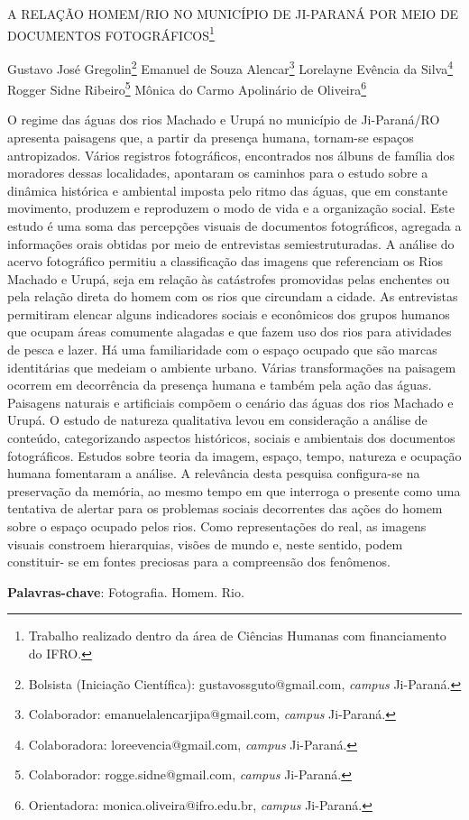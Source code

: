 \documentclass[article,12pt,onesidea,4paper,english,brazil]{abntex2}
\begin{document}
	
	
	\frenchspacing 
	
	\begin{center}
		\LARGE A RELAÇÃO HOMEM/RIO NO MUNICÍPIO DE JI-PARANÁ POR MEIO DE\\
		DOCUMENTOS FOTOGRÁFICOS\footnote{Trabalho realizado dentro da área de Ciências Humanas com financiamento do IFRO.}
		
		\normalsize
		Gustavo José Gregolin\footnote{Bolsista (Iniciação Científica): gustavossguto@gmail.com, \textit{campus} Ji-Paraná.} 
		Emanuel de Souza Alencar\footnote{Colaborador: emanuelalencarjipa@gmail.com, \textit{campus} Ji-Paraná.} 
		Lorelayne Evência da Silva\footnote{Colaboradora: loreevencia@gmail.com, \textit{campus} Ji-Paraná.} \\
		Rogger Sidne Ribeiro\footnote{Colaborador: rogge.sidne@gmail.com, \textit{campus} Ji-Paraná.}
		Mônica do Carmo Apolinário de Oliveira\footnote{Orientadora: monica.oliveira@ifro.edu.br, \textit{campus} Ji-Paraná.} 
	\end{center}
	
	\noindent O regime das águas dos rios Machado e Urupá no município de Ji-Paraná/RO
	apresenta paisagens que, a partir da presença humana, tornam-se espaços
	antropizados. Vários registros fotográficos, encontrados nos álbuns de família dos
	moradores dessas localidades, apontaram os caminhos para o estudo sobre a
	dinâmica histórica e ambiental imposta pelo ritmo das águas, que em constante
	movimento, produzem e reproduzem o modo de vida e a organização social. Este
	estudo é uma soma das percepções visuais de documentos fotográficos, agregada a
	informações orais obtidas por meio de entrevistas semiestruturadas. A análise do
	acervo fotográfico permitiu a classificação das imagens que referenciam os Rios
	Machado e Urupá, seja em relação às catástrofes promovidas pelas enchentes ou
	pela relação direta do homem com os rios que circundam a cidade. As entrevistas
	permitiram elencar alguns indicadores sociais e econômicos dos grupos humanos
	que ocupam áreas comumente alagadas e que fazem uso dos rios para atividades
	de pesca e lazer. Há uma familiaridade com o espaço ocupado que são marcas
	identitárias que medeiam o ambiente urbano. Várias transformações na paisagem
	ocorrem em decorrência da presença humana e também pela ação das águas.
	Paisagens naturais e artificiais compõem o cenário das águas dos rios Machado e
	Urupá. O estudo de natureza qualitativa levou em consideração a análise de
	conteúdo, categorizando aspectos históricos, sociais e ambientais dos documentos
	fotográficos. Estudos sobre teoria da imagem, espaço, tempo, natureza e ocupação
	humana fomentaram a análise. A relevância desta pesquisa configura-se na
	preservação da memória, ao mesmo tempo em que interroga o presente como uma
	tentativa de alertar para os problemas sociais decorrentes das ações do homem
	sobre o espaço ocupado pelos rios. Como representações do real, as imagens	
	visuais constroem hierarquias, visões de mundo e, neste sentido, podem constituir-
	se em fontes preciosas para a compreensão dos fenômenos.
	
	\vspace{\onelineskip}
	
	\noindent
	\textbf{Palavras-chave}: Fotografia. Homem. Rio.
	
\end{document}
